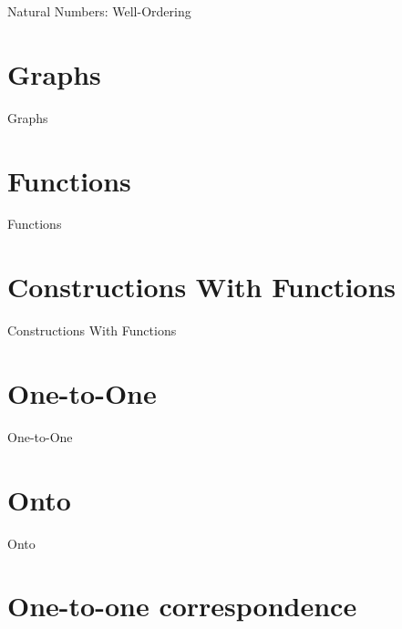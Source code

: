 Natural Numbers: Well-Ordering

\section{Graphs}
\label{sec:graphs}

Graphs

\section{Functions}
\label{sec:functions}

Functions

\section{Constructions With Functions}
\label{sec:constructions-with-functions}

Constructions With Functions

\section{One-to-One}
\label{sec:one-to-one}

One-to-One

\section{Onto}
\label{sec:onto}

Onto

\section{One-to-one correspondence}
\label{sec:one-to-one-correspondence}

